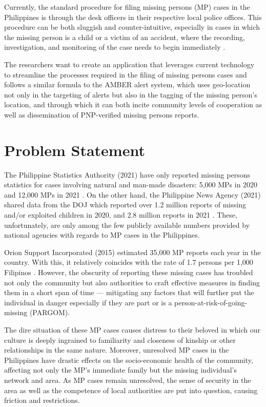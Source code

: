 Currently, the standard procedure for filing missing persons (MP) cases in the Philippines is through the desk officers in their respective local police offices. This procedure can be both sluggish and counter-intuitive, especially in cases in which the missing person is a child or a victim of an accident, where the recording, investigation, and monitoring of the case needs to begin immediately \cite{NationalPoliceCommission}.

The researchers want to create an application that leverages current technology to streamline the processes required in the filing of missing persons cases and follows a similar formula to the AMBER alert system, which uses geo-location not only in the targeting of alerts but also in the tagging of the missing person's location, and through which it can both incite community levels of cooperation as well as dissemination of PNP-verified missing persons reports. 


\section{Problem Statement}
The Philippine Statistics Authority (2021) have only reported missing persons statistics for cases involving natural and man-made disasters: 5,000 MPs in 2020 and 12,000 MPs in 2021 \cite{PSAOpenStat}. On the other hand, the Philippine News Agency (2021) shared data from the DOJ which reported over 1.2 million reports of missing and/or exploited children in 2020, and 2.8 million reports in 2021 \cite{pulta_2021}. These, unfortunately, are only among the few publicly available numbers provided by national agencies with regards to MP cases in the Philippines.

Orion Support Incorporated (2015) estimated 35,000 MP reports each year in the country. With this, it relatively coincides with the rate of 1.7 persons per 1,000 Filipinos \cite{orion_2021}. However, the obscurity of reporting these missing cases has troubled not only the community but also authorities to craft effective measures in finding them in a short span of time — mitigating any factors that will further put the individual in danger especially if they are part or is a person-at-risk-of-going-missing (PARGOM).

The dire situation of these MP cases causes distress to their beloved in which our culture is deeply ingrained to familiarity and closeness of kinship or other relationships in the same nature.  Moreover, unresolved MP cases in the Philippines have drastic effects on the socio-economic health of the community, affecting not only the MP’s immediate family but the missing individual’s network and area. As MP cases remain unresolved, the sense of security in the area as well as the competence of local authorities are put into question, causing friction and restrictions. 

